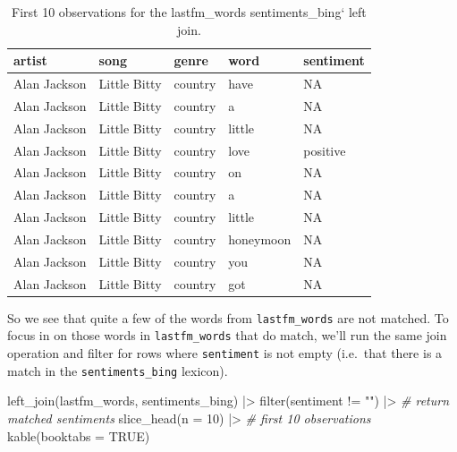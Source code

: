 \documentclass[
  letterpaper,
]{scrbook}
\newenvironment{Shaded}{\begin{snugshade}}{\end{snugshade}}
\newcommand{\AttributeTok}[1]{\textcolor[rgb]{0.00,0.00,0.00}{#1}}
\newcommand{\CommentTok}[1]{\textcolor[rgb]{0.00,0.00,0.00}{\textit{#1}}}
\newcommand{\ConstantTok}[1]{\textcolor[rgb]{0.00,0.00,0.00}{#1}}
\newcommand{\DecValTok}[1]{\textcolor[rgb]{0.00,0.00,0.00}{#1}}
\newcommand{\FunctionTok}[1]{\textcolor[rgb]{0.00,0.00,0.00}{#1}}
\newcommand{\NormalTok}[1]{\textcolor[rgb]{0.00,0.00,0.00}{#1}}
\newcommand{\SpecialCharTok}[1]{\textcolor[rgb]{0.00,0.00,0.00}{#1}}
\newcommand{\StringTok}[1]{\textcolor[rgb]{0.00,0.00,0.00}{#1}}
\begin{document}
\hypertarget{tbl-td-lastfm-words-bing-left-joing}{}
\begin{table}
\caption{\label{tbl-td-lastfm-words-bing-left-joing}First 10 observations for the lastfm\_words sentiments\_bing` left join. }\tabularnewline

\centering
\begin{tabular}{lllll}
\toprule
artist & song & genre & word & sentiment\\
\midrule
Alan Jackson & Little Bitty & country & have & NA\\
Alan Jackson & Little Bitty & country & a & NA\\
Alan Jackson & Little Bitty & country & little & NA\\
Alan Jackson & Little Bitty & country & love & positive\\
Alan Jackson & Little Bitty & country & on & NA\\
\addlinespace
Alan Jackson & Little Bitty & country & a & NA\\
Alan Jackson & Little Bitty & country & little & NA\\
Alan Jackson & Little Bitty & country & honeymoon & NA\\
Alan Jackson & Little Bitty & country & you & NA\\
Alan Jackson & Little Bitty & country & got & NA\\
\bottomrule
\end{tabular}
\end{table}

So we see that quite a few of the words from \texttt{lastfm\_words} are
not matched. To focus in on those words in \texttt{lastfm\_words} that
do match, we'll run the same join operation and filter for rows where
\texttt{sentiment} is not empty (i.e.~that there is a match in the
\texttt{sentiments\_bing} lexicon).

\begin{Shaded}
\begin{Highlighting}[]
\FunctionTok{left\_join}\NormalTok{(lastfm\_words, sentiments\_bing) }\SpecialCharTok{|\textgreater{}}
  \FunctionTok{filter}\NormalTok{(sentiment }\SpecialCharTok{!=} \StringTok{""}\NormalTok{) }\SpecialCharTok{|\textgreater{}} \CommentTok{\# return matched sentiments}
  \FunctionTok{slice\_head}\NormalTok{(}\AttributeTok{n =} \DecValTok{10}\NormalTok{) }\SpecialCharTok{|\textgreater{}} \CommentTok{\# first 10 observations}
  \FunctionTok{kable}\NormalTok{(}\AttributeTok{booktabs =} \ConstantTok{TRUE}\NormalTok{)}
\end{Highlighting}
\end{Shaded}
\end{document}
